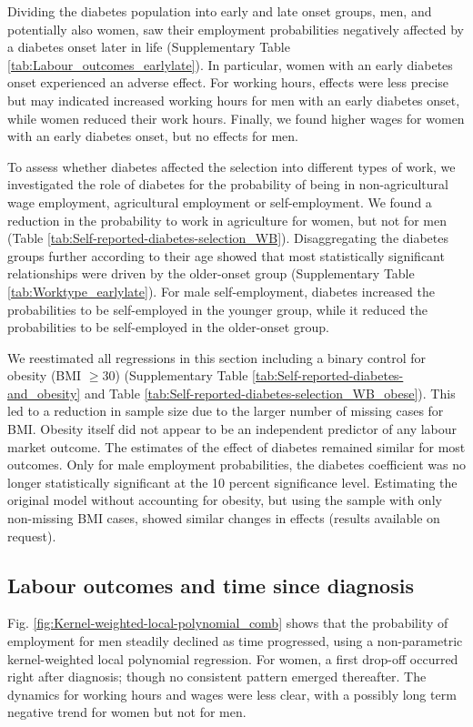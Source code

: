 \documentclass[12pt,english]{article}
\begin{document}
Dividing the diabetes population into early and late onset groups, men, and potentially also women, saw their employment probabilities negatively affected by a diabetes onset later in life (Supplementary Table \ref{tab:Labour_outcomes_earlylate}). In particular, women with an early diabetes onset experienced an adverse effect. For working hours, effects were less precise but may indicated increased working hours for men with an early diabetes onset, while women reduced their work hours. Finally, we found higher wages for women with an early diabetes onset, but no effects for men. 


To assess whether diabetes affected the selection into different types of work, we investigated the role of diabetes for the probability of being in non-agricultural wage employment, agricultural employment or self-employment. We found a reduction in the probability to work in agriculture for women, but not for men (Table \ref{tab:Self-reported-diabetes-selection_WB}). Disaggregating the diabetes groups further according to their age showed that most statistically significant relationships were driven by the older-onset group (Supplementary Table \ref{tab:Worktype_earlylate}). For male self-employment, diabetes increased the probabilities to be self-employed in the younger group, while it reduced the probabilities to be self-employed in the older-onset group.


We reestimated all regressions in this section including a binary control for obesity (BMI $\geq 30$) (Supplementary Table \ref{tab:Self-reported-diabetes-and_obesity} and Table \ref{tab:Self-reported-diabetes-selection_WB_obese}). This led to a reduction in sample size due to the larger number of missing cases for BMI. Obesity itself did not appear to be an independent predictor of any labour market outcome. The estimates of the effect of diabetes remained similar for most outcomes. Only for male employment probabilities, the diabetes coefficient was no longer statistically significant at the 10 percent significance level. Estimating the original model without accounting for obesity, but using the sample with only non-missing BMI cases, showed similar changes in effects (results available on request).


\subsection{\label{sec:duration}Labour outcomes and time since diagnosis }

Fig. \ref{fig:Kernel-weighted-local-polynomial_comb} shows that the probability of employment for men steadily declined as time progressed, using a non-parametric kernel-weighted local polynomial regression. For women, a first drop-off occurred right after diagnosis; though no consistent pattern emerged thereafter. The dynamics for working hours and wages were less clear, with a possibly long term negative trend for women but not for men.
\end{document}
